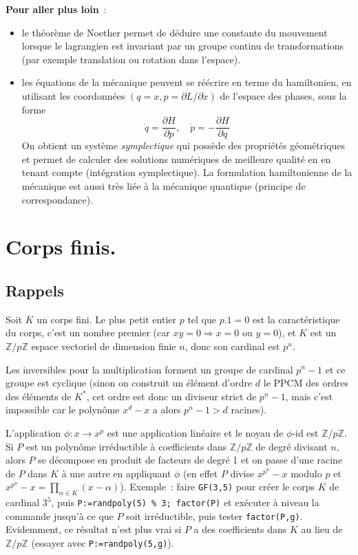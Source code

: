 \documentclass[a4paper,11pt]{book}
\begin{document}
\begin{giacjshere}
{\bf Pour aller plus loin}~:
\begin{itemize}
\item le th\'eor\`eme de Noether permet de d\'eduire une
constante du mouvement lorsque le lagrangien est invariant
par un groupe continu de transformations (par exemple
translation ou rotation dans l'espace).
\item les \'equations de la m\'ecanique peuvent se r\'e\'ecrire
en terme du hamiltonien, en utilisant 
les coordonn\'ees $(q=x,p=\partial L/\partial \dot{x})$
de l'espace des phases, sous la forme
$$ \dot{q}=\frac{\partial H}{\partial p}, \quad
\dot{p}=-\frac{\partial H}{\partial q}$$
On obtient un syst\`eme {\em symplectique}
qui poss\`ede des propri\'et\'es g\'eom\'etriques et permet
de calculer des solutions num\'eriques de meilleure qualit\'e en en tenant
compte (int\'egration symplectique). La formulation
hamiltonienne de la m\'ecanique est aussi tr\`es li\'ee \`a la 
m\'ecanique quantique (principe de correspondance).
\end{itemize}


\chapter{Corps finis.} \label{sec:gf}
\section{Rappels}
Soit $K$ un corps fini. Le plus petit entier $p$ tel que
$p.1=0$ est la caract\'eristique du corps, c'est un nombre premier
(car $xy=0 \Rightarrow x=0$ ou $y=0$), et $K$ est un $\mathbb{Z}/p\mathbb{Z}$
espace vectoriel de dimension finie $n$, donc son cardinal est $p^n$.

Les inversibles pour la multiplication forment un groupe de cardinal
$p^n-1$ et ce groupe est cyclique (sinon on construit un \'el\'ement
d'ordre $d$ le PPCM des ordres des \'el\'ements de $K^*$, cet ordre
est donc un diviseur strict de $p^n-1$, mais c'est impossible car
le polyn\^ome $x^d-x$ a alors $p^n-1>d$ racines).

L'application $\phi:x \rightarrow x^p$ est une application lin\'eaire
et le noyau de $\phi$-id est $\mathbb{Z}/p\mathbb{Z}$. Si $P$ est un polyn\^ome 
irr\'eductible \`a coefficients dans $\mathbb{Z}/p\mathbb{Z}$ de degr\'e divisant $n$, alors
$P$ se d\'ecompose en produit de facteurs de degr\'e 1 et on passe
d'une racine de $P$ dans $K$ \`a une autre en appliquant $\phi$
(en effet $P$ divise $x^{p^n}-x$ modulo $p$ et
$x^{p^n}-x=\prod_{\alpha \in K} (x-\alpha)$).
Exemple~: faire \verb|GF(3,5)| pour cr\'eer le corps $K$
de cardinal $3^5$, puis 
\verb|P:=randpoly(5) % 3; factor(P)|
et ex\'ecuter \`a niveau la commande jusqu'\`a ce que $P$ soit
irr\'eductible, puis tester \verb|factor(P,g)|.
Evidemment, ce r\'esultat n'est plus vrai si $P$ a des coefficients
dans $K$ au lieu de $\mathbb{Z}/p\mathbb{Z}$ (essayer avec \verb|P:=randpoly(5,g)|).


\end{giacjshere}
\end{document}
